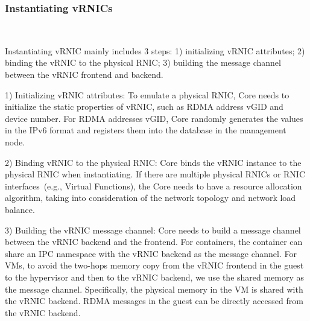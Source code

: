 \subsubsection{\textbf{Instantiating vRNICs}}
\
\noindent


Instantiating vRNIC mainly includes 3 steps: 1) initializing vRNIC attributes; 2) binding the vRNIC to the physical RNIC; 3) building the message channel between the vRNIC frontend and backend.


1) Initializing vRNIC attributes: To emulate a physical RNIC, \sys Core needs to initialize the static properties of vRNIC, such as RDMA address vGID and device number. For RDMA addresses vGID, \sys Core randomly generates the values in the IPv6 format and registers them into the database in the management node.


2) Binding vRNIC to the physical RNIC: \sys Core binds the vRNIC instance to the physical RNIC when instantiating. If there are multiple physical RNICs or RNIC interfaces~(e.g., Virtual Functions), the \sys Core needs to have a resource allocation algorithm, taking into consideration of the network topology and network load balance.


3) Building the vRNIC message channel: \sys Core needs to build a message channel between the vRNIC backend and the frontend.
For containers, the container can share an IPC namespace with the vRNIC backend as the message channel.
For VMs, to avoid the two-hops memory copy from the vRNIC frontend in the guest to the hypervisor and then to the vRNIC backend, we use the shared memory as the message channel. Specifically, the physical memory in the VM is shared with the vRNIC backend. RDMA messages in the guest can be directly accessed from the vRNIC backend.

